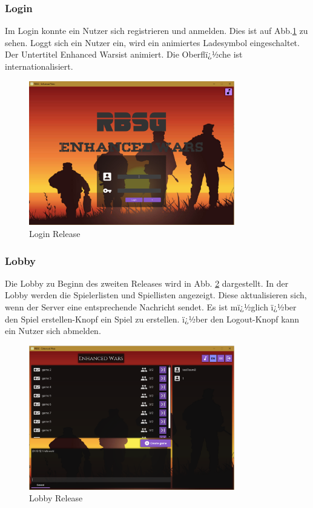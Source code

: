 \documentclass[12pt, titlepage]{scrartcl}
\newcommand{\RN}[1]{%
	\textup{\uppercase\expandafter{\romannumeral#1}}%
}
\begin{document}
		\subsubsection{Login}
			Im Login konnte ein Nutzer sich registrieren und anmelden. Dies ist auf Abb.\ref{Login_Release_One} zu sehen. Loggt sich ein Nutzer ein, wird ein animiertes Ladesymbol eingeschaltet. Der Untertitel \glqq Enhanced Wars\grqq ist animiert. Die Oberflï¿½che ist internationalisiert.
			\begin{figure}[H] 
				\centering
				\includegraphics[width=0.8\textwidth]{Login_Release_One.PNG}
				\caption{Login Release \RN{1}}
				\label{Login_Release_One}
			\end{figure}
		\subsubsection{Lobby}
		Die Lobby zu Beginn des zweiten Releases wird in Abb. \ref{Lobby_Release_One} dargestellt. In der Lobby werden die Spielerlisten und Spiellisten angezeigt. Diese aktualisieren sich, wenn der Server eine entsprechende Nachricht sendet. Es ist mï¿½glich ï¿½ber den \glqq Spiel erstellen\grqq-Knopf ein Spiel zu erstellen. ï¿½ber den \glqq Logout\grqq-Knopf kann ein Nutzer sich abmelden.
		\begin{figure}[H] 
			\centering
			\includegraphics[width=0.8\textwidth]{Lobby_Release_One.PNG}
			\caption{Lobby Release \RN{1}}
			\label{Lobby_Release_One}
		\end{figure}
\end{document}
